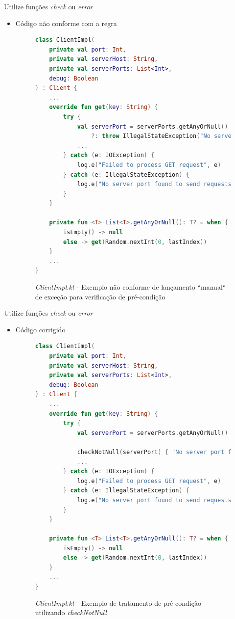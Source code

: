 \documentclass[brazilian]{beamer}
\begin{document}
\begin{frame}[fragile]{Utilize funções \textit{check} ou \textit{error}}
    \begin{itemize}
        \item Código não conforme com a regra
        \begin{figure}[H]
            \centering
            \begin{lstlisting}[language=Kotlin]
class ClientImpl(
    private val port: Int,
    private val serverHost: String,
    private val serverPorts: List<Int>,
    debug: Boolean
) : Client {
    ...
    override fun get(key: String) {
        try {
            val serverPort = serverPorts.getAnyOrNull() 
                ?: throw IllegalStateException("No server port found to send request")
            ...
        } catch (e: IOException) {
            log.e("Failed to process GET request", e)
        } catch (e: IllegalStateException) {
            log.e("No server port found to send requests", e)
        }
    }

    private fun <T> List<T>.getAnyOrNull(): T? = when {
        isEmpty() -> null
        else -> get(Random.nextInt(0, lastIndex))
    }
    ...
}
            \end{lstlisting}
            \caption{\textit{ClientImpl.kt} - Exemplo não conforme de lançamento ``manual`` de exceção para verificação de pré-condição}
            \label{fig:detekt_use_error_or_check_before_example}
        \end{figure}
    \end{itemize}
\end{frame}

\begin{frame}[fragile]{Utilize funções \textit{check} ou \textit{error}}
    \begin{itemize}
        \item Código corrigido
        \begin{figure}[H]
            \centering
            \begin{lstlisting}[language=Kotlin]
class ClientImpl(
    private val port: Int,
    private val serverHost: String,
    private val serverPorts: List<Int>,
    debug: Boolean
) : Client {
    ...
    override fun get(key: String) {
        try {
            val serverPort = serverPorts.getAnyOrNull()
            
            checkNotNull(serverPort) { "No server port found to send request" }
            ...
        } catch (e: IOException) {
            log.e("Failed to process GET request", e)
        } catch (e: IllegalStateException) {
            log.e("No server port found to send requests", e)
        }
    }

    private fun <T> List<T>.getAnyOrNull(): T? = when {
        isEmpty() -> null
        else -> get(Random.nextInt(0, lastIndex))
    }
    ...
}
            \end{lstlisting}
            \caption{\textit{ClientImpl.kt} - Exemplo de tratamento de pré-condição utilizando \textit{checkNotNull}}
            \label{fig:detekt_use_error_or_check_after_example}
        \end{figure}
    \end{itemize}
\end{frame}
\end{document}
